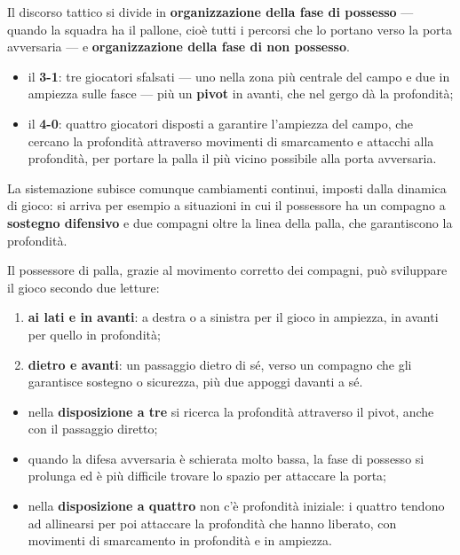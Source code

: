 Il discorso tattico si divide in \textbf{organizzazione della fase di possesso} --- quando la
squadra ha il pallone, cioè tutti i percorsi che lo portano verso la porta avversaria --- e
\textbf{organizzazione della fase di non possesso}.

\begin{itemize}
  \item il \textbf{3-1}: tre giocatori sfalsati --- uno nella zona più centrale del campo e due in
    ampiezza sulle fasce --- più un \textbf{pivot} in avanti, che nel gergo dà la profondità;
  \item il \textbf{4-0}: quattro giocatori disposti a garantire l'ampiezza del campo, che cercano la
    profondità attraverso movimenti di smarcamento e attacchi alla profondità, per portare la palla
    il più vicino possibile alla porta avversaria.
\end{itemize}
La sistemazione subisce comunque cambiamenti continui, imposti dalla dinamica di gioco: si arriva
per esempio a situazioni in cui il possessore ha un compagno a \textbf{sostegno difensivo} e due
compagni oltre la linea della palla, che garantiscono la profondità.

Il possessore di palla, grazie al movimento corretto dei compagni, può sviluppare il gioco secondo
due letture:
\begin{enumerate}
  \item \textbf{ai lati e in avanti}: a destra o a sinistra per il gioco in ampiezza, in avanti per
    quello in profondità;
  \item \textbf{dietro e avanti}: un passaggio dietro di sé, verso un compagno che gli garantisce
    sostegno o sicurezza, più due appoggi davanti a sé.
\end{enumerate}

\begin{itemize}
  \item nella \textbf{disposizione a tre} si ricerca la profondità attraverso il pivot, anche con il
    passaggio diretto;
  \item quando la difesa avversaria è schierata molto bassa, la fase di possesso si prolunga ed è
    più difficile trovare lo spazio per attaccare la porta;
  \item nella \textbf{disposizione a quattro} non c'è profondità iniziale: i quattro tendono ad
    allinearsi per poi attaccare la profondità che hanno liberato, con movimenti di smarcamento in
    profondità e in ampiezza.
\end{itemize}

